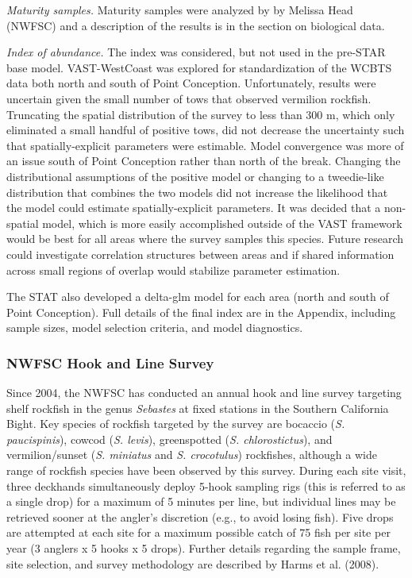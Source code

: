 \documentclass[
  english,
  a4paper,
]{article}
\begin{document}
\emph{Maturity samples.} Maturity samples were analyzed by by Melissa Head (NWFSC) and a
description of the results is in the section on biological data.

\emph{Index of abundance.} The index was considered, but not used in the pre-STAR
base model. VAST-WestCoast was explored for standardization of the WCBTS data both
north and south of Point Conception. Unfortunately, results were uncertain given
the small number of tows that observed vermilion rockfish. Truncating the spatial
distribution of the survey to less than 300 m, which only eliminated a small
handful of positive tows, did not decrease the uncertainty such that
spatially-explicit parameters were estimable. Model convergence was more of an
issue south of Point Conception rather than north of the break. Changing the
distributional assumptions of the positive model or changing to a tweedie-like
distribution that combines the two models did not increase the likelihood that
the model could estimate spatially-explicit parameters. It was decided that a
non-spatial model, which is more easily accomplished outside of the VAST
framework would be best for all areas where the survey samples this species.
Future research could investigate correlation structures between areas and if
shared information across small regions of overlap would stabilize parameter estimation.

The STAT also developed
a delta-glm model for each area (north and south of Point Conception). Full details
of the final index are in the Appendix, including
sample sizes, model selection criteria, and model diagnostics.

\hypertarget{nwfsc-hook-and-line-survey}{%
\subsubsection{NWFSC Hook and Line Survey}\label{nwfsc-hook-and-line-survey}}

Since 2004, the NWFSC has conducted an annual hook and line survey targeting shelf
rockfish in the genus \emph{Sebastes} at fixed stations in the Southern California
Bight. Key species of rockfish
targeted by the survey are bocaccio (\emph{S. paucispinis}), cowcod (\emph{S. levis}),
greenspotted (\emph{S. chlorostictus}), and vermilion/sunset (\emph{S. miniatus} and
\emph{S. crocotulus}) rockfishes, although a wide range of rockfish species have
been observed by this survey. During each site visit, three deckhands simultaneously
deploy 5-hook sampling rigs (this is referred to as a single drop) for a maximum
of 5 minutes per line, but individual lines may be retrieved sooner at the
angler's discretion (e.g., to avoid losing fish). Five drops are attempted at
each site for a maximum possible catch of 75 fish per site per year (3 anglers
x 5 hooks x 5 drops). Further details regarding the sample frame, site
selection, and survey methodology are described by Harms et al. (2008).
\end{document}
